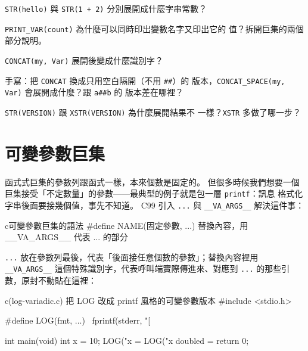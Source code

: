 
\begin{drills}[label=drills:pp-stringize]
\item \texttt{STR(hello)} 與 \texttt{STR(1 + 2)} 分別展開成什麼字串常數？
\item \texttt{PRINT\_VAR(count)} 為什麼可以同時印出變數名字又印出它的
值？拆開巨集的兩個部分說明。
\item \texttt{CONCAT(my, Var)} 展開後變成什麼識別字？
\item 手寫：把 \texttt{CONCAT} 換成只用空白隔開（不用 \texttt{\#\#}）的
版本，\texttt{CONCAT\_SPACE(my, Var)} 會展開成什麼？跟 \texttt{a\#\#b} 的
版本差在哪裡？
\item \texttt{STR(VERSION)} 跟 \texttt{XSTR(VERSION)} 為什麼展開結果不
一樣？\texttt{XSTR} 多做了哪一步？
\end{drills}

\section{可變參數巨集}
\label{sec:pp-variadic}

函式式巨集的參數列跟函式一樣，本來個數是固定的。 但很多時候我們想要一個
巨集接受「不定數量」的參數——最典型的例子就是包一層 \texttt{printf}：訊息
格式化字串後面要接幾個值，事先不知道。 C99 引入 \texttt{...} 與
\texttt{\_\_VA\_ARGS\_\_} 解決這件事：

\begin{code}{c}{可變參數巨集的語法}
#define NAME(固定參數, ...) 替換內容，用 __VA_ARGS__ 代表 ... 的部分
\end{code}

\texttt{...} 放在參數列最後，代表「後面接任意個數的參數」；替換內容裡用
\texttt{\_\_VA\_ARGS\_\_} 這個特殊識別字，代表呼叫端實際傳進來、對應到
\texttt{...} 的那些引數，原封不動貼在這裡：

\begin{example}{c}{(log-variadic.c) 把 LOG 改成 printf 風格的可變參數版本}
#include <stdio.h>

#define LOG(fmt, ...) \
    fprintf(stderr, "[%

int main(void) {
    int x = 10;
    LOG("x = %
    LOG("x doubled = %
    return 0;
}
\end{example}

